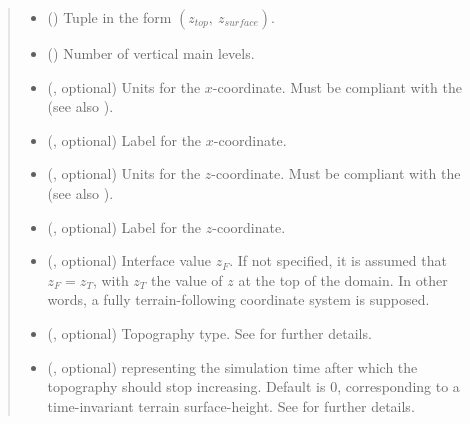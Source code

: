 \documentclass[letterpaper,10pt,english]{sphinxmanual}
\begin{document}
\begin{fulllineitems}
\begin{fulllineitems}
\begin{quote}
\begin{description}
\begin{itemize}
\item {} 
 () \textendash{} Tuple in the form \((z_{top}, ~ z_{surface})\).

\item {} 
 () \textendash{} Number of vertical main levels.

\item {} 
 (, optional) \textendash{} 
Units for the \(x\)-coordinate. Must be compliant with the 
(see also {\hyperref[\detokenize{api:tasmania.grids.axis.Axis.__init__}]{}}).


\item {} 
 (, optional) \textendash{} Label for the \(x\)-coordinate.

\item {} 
 (, optional) \textendash{} 
Units for the \(z\)-coordinate. Must be compliant with the 
(see also {\hyperref[\detokenize{api:tasmania.grids.axis.Axis.__init__}]{}}).


\item {} 
 (, optional) \textendash{} Label for the \(z\)-coordinate.

\item {} 
 (, optional) \textendash{} Interface value \(z_F\). If not specified, it is assumed that \(z_F = z_T\), with \(z_T\) the
value of \(z\) at the top of the domain. In other words, a fully terrain-following coordinate system is
supposed.

\item {} 
 (, optional) \textendash{} Topography type. See {\hyperref[\detokenize{api:module-tasmania.grids.topography}]{}} for further details.

\item {} 
 (, optional) \textendash{}  representing the simulation time after which the topography should stop
increasing. Default is 0, corresponding to a time-invariant terrain surface-height. See
{\hyperref[\detokenize{api:module-tasmania.grids.topography}]{}} for further details.


\end{itemize}
\end{description}
\end{quote}
\end{fulllineitems}
\end{fulllineitems}
\end{document}

